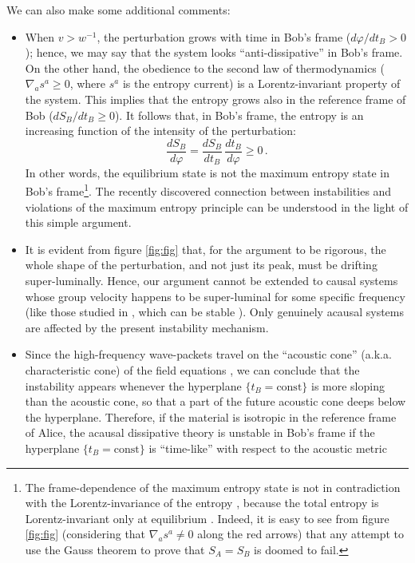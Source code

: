 \documentclass[a4paper, amsfonts, amssymb, amsmath, reprint, showkeys,  twoside, onecolumn,notitlepage,nofootinbib]{revtex4-1}
\theoremstyle{definition}
\theoremstyle{theorem}
\begin{document}
We can also make some additional comments:
\begin{itemize}
\item When $v>w^{-1}$, the perturbation grows with time in Bob's frame ($d\varphi/dt_B>0$); hence, we may say that the system looks ``anti-dissipative'' in Bob's frame. On the other hand, the obedience to the second law of thermodynamics ($\nabla_a s^a \geq 0$, where $s^a$ is the entropy current) is a Lorentz-invariant property of the system. This implies that the entropy grows also in the reference frame of Bob ($dS_B/dt_B \geq 0$). It follows that, in Bob's frame, the entropy is an increasing function of the intensity of the perturbation:
\begin{equation}
\dfrac{dS_B}{d\varphi} = \dfrac{dS_B}{dt_B} \, \dfrac{dt_B}{d\varphi} \geq 0 \, .
\end{equation}
In other words, the equilibrium state is not the maximum entropy state in Bob's frame\footnote{The frame-dependence of the maximum entropy state is not in contradiction with the Lorentz-invariance of the entropy \cite{GavassinoLorentzInvariance2021}, because the total entropy is Lorentz-invariant only at equilibrium \cite{Becattini2016}. Indeed, it is easy to see from figure \ref{fig:fig} (considering that $\nabla_a s^a \neq 0$ along the red arrows) that any attempt to use the Gauss theorem to prove that $S_A =S_B$ is doomed to fail.}. The recently discovered connection between instabilities and violations of the maximum entropy principle \cite{GavassinoLyapunov_2020,GavassinoGibbs2021,GavassinoCausality2021}
can be understood in the light of this simple argument.
\item It is evident from figure \ref{fig:fig} that, for the argument to be rigorous, the whole shape of the perturbation, and not just its peak, must be drifting super-luminally. Hence, our argument cannot be extended to causal systems whose group velocity happens to be super-luminal for some specific frequency (like those studied in \cite{Guoy1996,WangSuper2000,Withayachumnankul2010}, which can be stable \cite{Pu2010}). Only genuinely acausal systems \cite{Susskind1969} are affected by the present instability mechanism.
\item Since the high-frequency wave-packets travel on the ``acoustic cone'' (a.k.a. characteristic cone) of the field equations \cite{kessence}, we can conclude that the instability appears whenever the hyperplane $ \{ t_B=\text{const} \}$ is more sloping than the acoustic cone, so that a part of the future acoustic cone deeps below the hyperplane. Therefore, if the material is isotropic in the reference frame of Alice, the acausal dissipative theory is unstable in Bob's frame if the hyperplane $\{ t_B = \text{const} \}$ is ``time-like'' with respect to the acoustic metric

\end{itemize}
\end{document}
